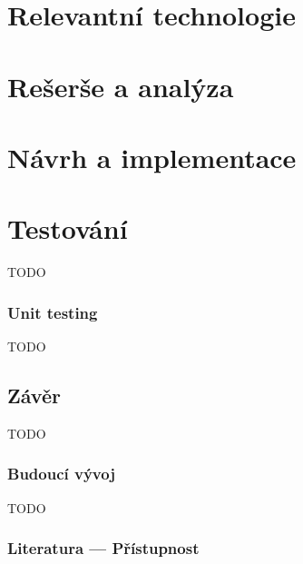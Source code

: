 \documentclass{ctuthesis}
\begin{document}
\maketitle



\part{Relevantní technologie}




\part{Rešerše a analýza}




\part{Návrh a implementace}




\part{Testování}

TODO

\section{Unit testing}

TODO

\chapter{Závěr}

TODO

\section{Budoucí vývoj}

TODO

\appendix

\printbibliography[title={Seznam literatury}]

\section{Literatura --- Přístupnost}
\end{document}
